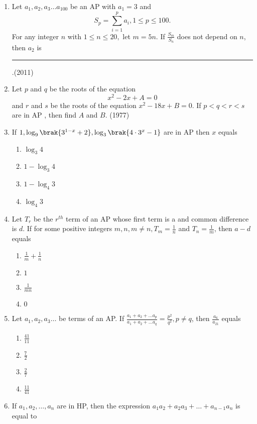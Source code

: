\begin{enumerate}[label=\thesubsection.\arabic*,ref=\thesubsection.\theenumi]

\item Let $a_{1},  a_{2},  a_{3}\dots a_{100}$ be an  AP  with $a_{1}= 3$ and $$S_{p} =\sum\limits_{i=1}^{p} a_{i}, 1\leq p\leq 100.$$ For any integer $n$ with $1 \leq n \leq 20, $ let $m= 5n$. If $\frac{S_{m}}{S_{n}}$ does not depend on $n$,  then $a_{2}$ is \rule{1cm}{0.1pt}.\hfill(2011)

		  \item  Let $p$ and $q$ be the roots of the equation                    $${x^2-2x+A=0}$$ and $r$ and $s$ be the roots of the                     equation ${x^2-18x+B=0}$. If ${p<q<r<s}$ are                                      in  AP ,  then find $A$ and $B$. \hfill{(1977)}
	\item {If $ 1,  \log_9 \brak{3^{1-x} +2},  \log_3 \brak{4\cdot3^x -1}$ are in AP then $x$ equals}
{\hfill{}}
\begin{multicols}{4}
\begin{enumerate}    
\item  {$\log_3 4$}
 \item {$1-\log_3 4$}
 \item {$1-\log_4 3$}
 \item {$\log_4 3$}
\end{enumerate}
\end{multicols}
%
\item {Let $T_r$ be the $r^{th}$ term of an AP whose first term is a and common difference is $d$. If for some positive integers $m, n,  m\neq n,  T_m = \frac{1}{n}$ and $T_n = \frac{1}{m}$,  then $a-d$ equals} 
{\hfill{}}
\begin{multicols}{4}
\begin{enumerate}    
\item  {$\frac{1}{m}+\frac{1}{n}$}
\item  {$1$}
\item  {$\frac{1}{mn}$}
\item  {$0$}
\end{enumerate}
\end{multicols}
\item Let $a_1,  a_2,  a_3 \dots$ be terms of an AP. If $\frac{a_1+a_2+\dots a_p}{a_1+a_2+\dots a_q}= \frac{p^2}{q^2},  p \neq q$,  then $\frac{a_6}{a_{21}}$ equals
\hfill {}
\begin{multicols}{4}
\begin{enumerate}    
\item  {$\frac{41}{11}$}
\item  {$\frac{7}{2}$}
\item  {$\frac{2}{7}$}
\item  {$\frac{11}{41}$}
\end{enumerate}
\end{multicols}
    \item If $a_1, a_2, \dots, a_n$ are in HP,  then the expression $a_1a_2+a_2a_3+\dots+a_{n-1}a_n$ is equal to


\end{enumerate}
